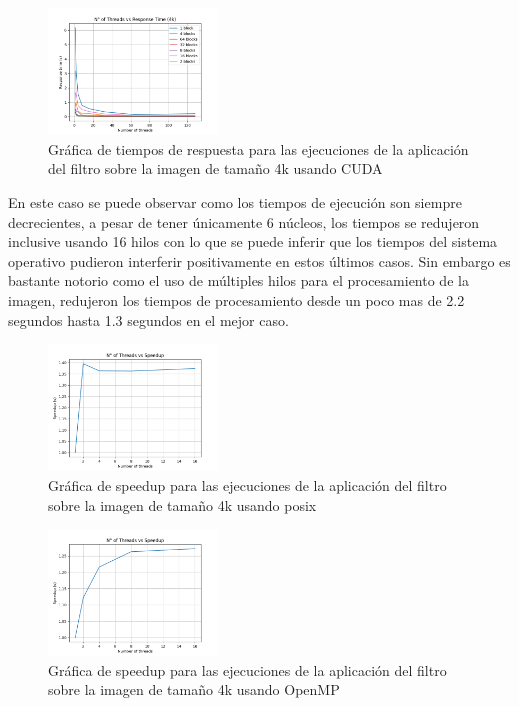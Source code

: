 \begin{figure}[H]
    \centering
    \includegraphics[width=0.4\textwidth]{../plots/cuda_4k_response_time.png}
    \caption{Gráfica de tiempos de respuesta para las ejecuciones de la aplicación del filtro sobre la imagen de tamaño 4k usando CUDA}
\end{figure}

En este caso se puede observar como los tiempos de ejecución son siempre decrecientes, a pesar de tener únicamente 6 núcleos, los tiempos se redujeron inclusive usando 16 hilos con lo que se puede inferir que los tiempos del sistema operativo pudieron interferir positivamente en estos últimos casos. Sin embargo es bastante notorio como el uso de múltiples hilos para el procesamiento de la imagen, redujeron los tiempos de procesamiento desde un poco mas de 2.2 segundos hasta 1.3 segundos en el mejor caso.

\begin{figure}[H]
    \centering
    \includegraphics[width=0.4\textwidth]{../plots/4k_speedup.png}
    \caption{Gráfica de speedup para las ejecuciones de la aplicación del filtro sobre la imagen de tamaño 4k usando posix}
\end{figure}

\begin{figure}[H]
    \centering
    \includegraphics[width=0.4\textwidth]{../plots/omp_4k_speedup.png}
    \caption{Gráfica de speedup para las ejecuciones de la aplicación del filtro sobre la imagen de tamaño 4k usando OpenMP}
\end{figure}

